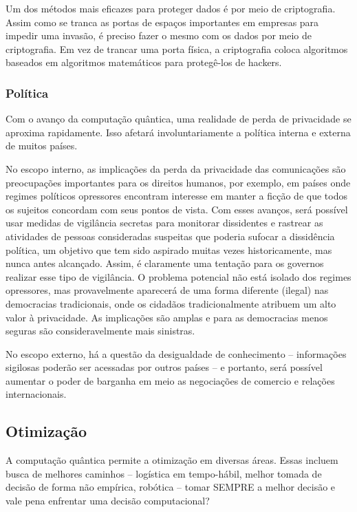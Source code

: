 Um dos métodos mais eficazes para proteger dados é por meio de criptografia. Assim como se tranca as portas de espaços importantes em empresas para impedir uma invasão, é preciso fazer o mesmo com os dados por meio de criptografia. Em vez de trancar uma porta física, a criptografia coloca algoritmos baseados em algoritmos matemáticos para protegê-los de hackers.


\subsubsection{Política}
Com o avanço da computação quântica, uma realidade de perda de privacidade se aproxima rapidamente. Isso afetará involuntariamente a política interna e externa de muitos países. 

No escopo interno, as implicações da perda da privacidade das comunicações são preocupações importantes para os direitos humanos, por exemplo, em países onde regimes políticos opressores encontram interesse em manter a ficção de que todos os sujeitos concordam com seus pontos de vista. Com esses avanços, será possível usar medidas de vigilância secretas para monitorar dissidentes e rastrear as atividades de pessoas consideradas suspeitas que poderia sufocar a dissidência política, um objetivo que tem sido aspirado muitas vezes historicamente, mas nunca antes alcançado.  Assim, é claramente uma tentação para os governos realizar esse tipo de vigilância. O problema potencial não está isolado dos regimes opressores, mas provavelmente aparecerá de uma forma diferente (ilegal) nas democracias tradicionais, onde os cidadãos tradicionalmente atribuem um alto valor à privacidade. As implicações são amplas e para as democracias menos seguras são consideravelmente mais sinistras.

No escopo externo,  há a questão da desigualdade de conhecimento – informações sigilosas poderão ser acessadas por outros países – e portanto, será possível aumentar o poder de barganha em meio as negociações de comercio e relações internacionais.

\subsection{Otimização}
A computação quântica permite a otimização em diversas áreas. Essas incluem busca de melhores caminhos – logística em tempo-hábil,  melhor tomada de decisão de forma não empírica, robótica – tomar SEMPRE a melhor decisão e vale pena enfrentar uma decisão computacional?


